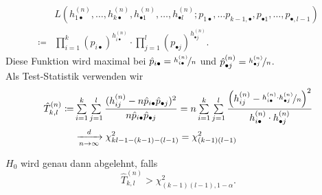\documentclass{cheat-sheet}
\begin{document}
\begin{verf}
  \begin{align*}
    & L(h_{1 \bullet}^{(n)}, \ldots, h_{k \bullet}^{(n)}, h_{\bullet 1}^{(n)}, \ldots, h_{\bullet l}^{(n)}; p_{1 \bullet}, \ldots p_{k-1, \bullet}, p_{\bullet 1}, \ldots, p_{\bullet, l-1}) \\
    \coloneqq & \prod_{i=1}^{k} (p_{i \bullet})^{h_{i \bullet}^{(n)}} \cdot \prod_{j=1}^l (p_{\bullet j})^{h_{\bullet j}^{(n)}}.
  \end{align*}
  Diese Funktion wird maximal bei $\hat{p}_{i \bullet} = \nicefrac{h_{i \bullet}^{(n)}}{n}$ und $\hat{p}_{\bullet j}^{(n)} = \nicefrac{h_{\bullet j}^{(n)}}{n}$. \\
  Als Test-Statistik verwenden wir
  \begin{align*}
    \hat{T}_{k,l}^{(n)} \coloneqq &
    \sum_{i=1}^k \sum_{j=1}^l \frac{(h_{ij}^{(n)} - n \hat{p}_{i \bullet} \hat{p}_{\bullet j})^2}{n \hat{p}_{i \bullet} \hat{p}_{\bullet j}} =
    n \sum_{i=1}^k \sum_{j=1}^l \frac{\left( h_{ij}^{(n)} - \nicefrac{h_{i \bullet}^{(n)} \cdot h_{\bullet j}^{(n)}}{n} \right)^2}{h_{i \bullet}^{(n)} \cdot h_{\bullet j}^{(n)}} \\
    & \xra[n \to \infty]{d} \chi^2_{kl - 1 - (k{-}1) - (l{-}1)} = \chi^2_{(k-1)(l-1)}
  \end{align*}
\end{verf}

\begin{entscheidungsregel}
  $H_0$ wird genau dann abgelehnt, falls
  \[ \hat{T}_{k,l}^{(n)} > \chi^2_{(k-1)(l-1),1-\alpha}. \]
\end{entscheidungsregel}
\end{document}
